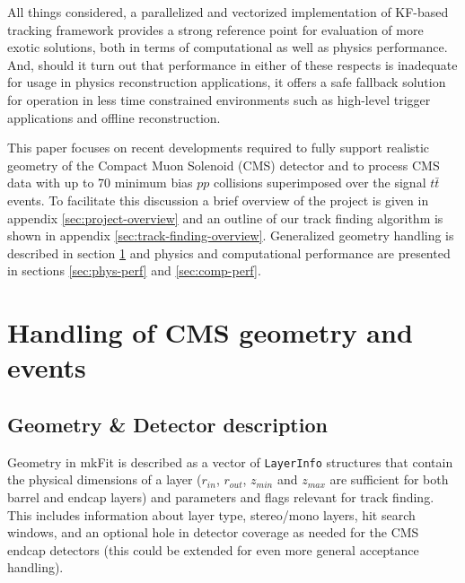 \documentclass{webofc}
\def\mkfit{mkFit\xspace}
\def\stt#1{{\small\texttt{#1}}}
\begin{document}
All things considered, a parallelized and vectorized implementation of KF-based
tracking framework provides a strong reference point for evaluation of more
exotic solutions, both in terms of computational as well as physics
performance. And, should it turn out that performance in either of these
respects is inadequate for usage in physics reconstruction applications, it
offers a safe fallback solution for operation in less time constrained
environments such as high-level trigger applications and offline reconstruction.

This paper focuses on recent developments required to fully support realistic
geometry of the Compact Muon Solenoid (CMS) detector and to process CMS data
with up to 70 minimum bias $pp$ collisions superimposed over the signal $t\bar{t}$
events. To facilitate this discussion a brief overview of the project is given
in appendix \ref{sec:project-overview} and an outline of our track finding
algorithm is shown in appendix \ref{sec:track-finding-overview}. Generalized
geometry handling is described in section \ref{sec:cms-geom-and-events} and
physics and computational performance are presented in sections
\ref{sec:phys-perf} and \ref{sec:comp-perf}.


\section{Handling of CMS geometry and events}
\label{sec:cms-geom-and-events}

\subsection{Geometry \& Detector description}

Geometry in \mkfit is described as a vector of \stt{LayerInfo} structures
that contain the physical dimensions of a layer ($r_{in}$, $r_{out}$, $z_{min}$
and $z_{max}$ are sufficient for both barrel and endcap layers) and parameters
and flags relevant for track finding. This includes information about layer
type, stereo/mono layers, hit search windows, and an optional hole in detector
coverage as needed for the CMS endcap detectors (this could be extended for
even more general acceptance handling).
\end{document}
